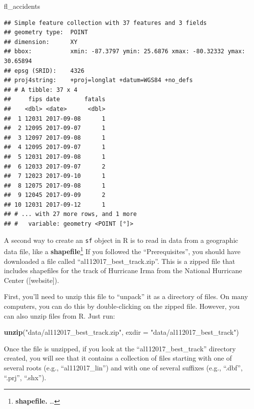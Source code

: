 \documentclass[]{tufte-book}
\newenvironment{Shaded}{}{}
\newcommand{\DataTypeTok}[1]{\textcolor[rgb]{0.56,0.13,0.00}{#1}}
\newcommand{\KeywordTok}[1]{\textcolor[rgb]{0.00,0.44,0.13}{\textbf{#1}}}
\newcommand{\NormalTok}[1]{#1}
\newcommand{\StringTok}[1]{\textcolor[rgb]{0.25,0.44,0.63}{#1}}
\begin{document}
\begin{Shaded}
\begin{Highlighting}[]
\NormalTok{fl_accidents}
\end{Highlighting}
\end{Shaded}

\begin{verbatim}
## Simple feature collection with 37 features and 3 fields
## geometry type:  POINT
## dimension:      XY
## bbox:           xmin: -87.3797 ymin: 25.6876 xmax: -80.32332 ymax: 30.65894
## epsg (SRID):    4326
## proj4string:    +proj=longlat +datum=WGS84 +no_defs
## # A tibble: 37 x 4
##     fips date       fatals
##    <dbl> <date>      <dbl>
##  1 12031 2017-09-08      1
##  2 12095 2017-09-07      1
##  3 12097 2017-09-08      1
##  4 12095 2017-09-07      1
##  5 12031 2017-09-08      1
##  6 12033 2017-09-07      2
##  7 12023 2017-09-10      1
##  8 12075 2017-09-08      1
##  9 12045 2017-09-09      2
## 10 12031 2017-09-12      1
## # ... with 27 more rows, and 1 more
## #   variable: geometry <POINT [°]>
\end{verbatim}

A second way to create an \texttt{sf} object in R is to read in data from a geographic data file, like
a \textbf{shapefile}\footnote{\textbf{shapefile.} \ldots{}}
If you followed the ``Prerequisites'', you should have downloaded a file called
``al112017\_best\_track.zip''. This is a zipped file that includes shapefiles for the track of
Hurricane Irma from the National Hurricane Center ({[}website{]}).

First, you'll need to unzip this file to ``unpack'' it as a directory of files. On many
computers, you can do this by double-clicking on the zipped file. However, you can also
unzip files from R. Just run:

\begin{Shaded}
\begin{Highlighting}[]
\KeywordTok{unzip}\NormalTok{(}\StringTok{"data/al112017_best_track.zip"}\NormalTok{, }\DataTypeTok{exdir =} \StringTok{"data/al112017_best_track"}\NormalTok{)}
\end{Highlighting}
\end{Shaded}

Once the file is unzipped, if you look at the ``al112017\_best\_track'' directory created,
you will see that it contains a collection of files starting with one of several roots
(e.g., ``al112017\_lin'') and with one of several suffixes (e.g., ``.dbf'', ``.prj'', ``.shx'').
\end{document}
